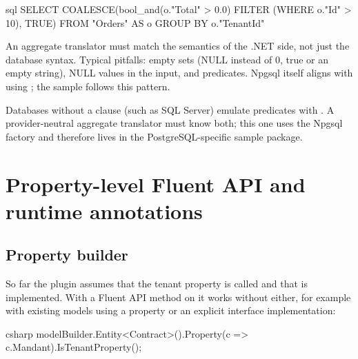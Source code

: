 \begin{sourcecode}[Generated SQL for g.\allowbreak{}Where(\allowbreak{}o => o.\allowbreak{}Id > 10).\allowbreak{}Select(\allowbreak{}o => o.\allowbreak{}Total > 0)]{sql}
SELECT COALESCE(bool_and(o."Total" > 0.0) FILTER (WHERE o."Id" > 10), TRUE)
FROM "Orders" AS o
GROUP BY o."TenantId"
\end{sourcecode}

\begin{important}
  An aggregate translator must match the semantics of the .NET side, not just the database
  syntax. Typical pitfalls: empty sets (NULL instead of 0, true or an empty string), NULL
  values in the input, and predicates. Npgsql itself aligns 
  with  using ; the sample follows this
  pattern.
\end{important}

Databases without a  clause (such as SQL Server) emulate predicates with
. A provider-neutral aggregate translator must know
both; this one uses the Npgsql factory and therefore lives in the PostgreSQL-specific sample package.

\chapter{Property-level Fluent API and runtime annotations}\label{ch:property-level-fluent-api-and}

\section{Property builder}

So far the plugin assumes that the tenant property is called 
and that  is implemented. With a Fluent API method on
 it works without either, for example with existing
models using a property  or an explicit interface
implementation:

\begin{sourcecode}[Usage]{csharp}
modelBuilder.Entity<Contract>().Property(c => c.Mandant).IsTenantProperty();
\end{sourcecode}

